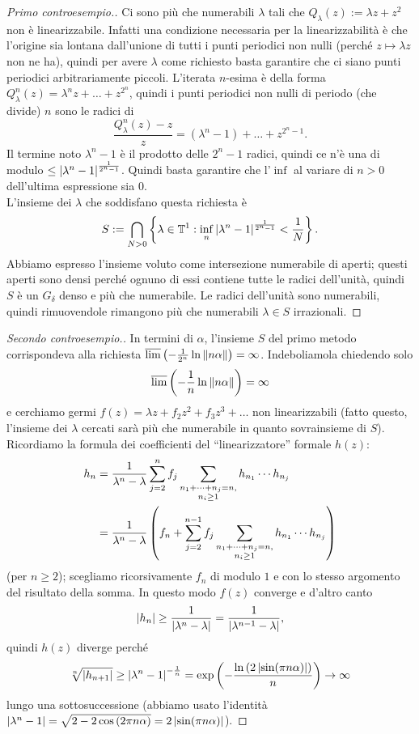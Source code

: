 \begin{proof}[Primo controesempio.]
Ci sono più che numerabili $\lambda$ tali che $Q_\lambda(z):=\lambda z+z^2$ non è linearizzabile.
Infatti una condizione necessaria per la linearizzabilità è che l'origine sia lontana dall'unione di tutti
i punti periodici non nulli (perché $z\mapsto \lambda z$ non ne ha), quindi per avere $\lambda$ come richiesto basta garantire che ci siano punti periodici arbitrariamente piccoli. L'iterata $n$-esima è della forma $Q_\lambda^n(z)=\lambda^n z+\dots+z^{2^n}$, quindi i punti periodici non nulli di periodo (che divide) $n$ sono le radici di
\[ \frac{Q_\lambda^n(z)-z}{z}=(\lambda^n-1)+\dots+z^{2^n-1}. \]
Il termine noto $\lambda^n-1$ è il prodotto delle $2^n-1$ radici, quindi ce n'è una di modulo $\le\left|\lambda^n-1\right|^{\frac{1}{2^n-1}}$.
Quindi basta garantire che l'$\inf$ al variare di $n>0$ dell'ultima espressione sia $0$. \\
L'insieme dei $\lambda$ che soddisfano questa richiesta è
\[ S:=\bigcap_{N>0}\left\{\lambda\in\mathbb{T}^1:\inf_n\left|\lambda^n-1\right|^{\frac{1}{2^n-1}}<\frac{1}{N}\right\}. \]
Abbiamo espresso l'insieme voluto come intersezione numerabile di aperti; questi aperti sono densi perché ognuno di essi contiene tutte le radici dell'unità, quindi $S$ è un $G_\delta$ denso e più che numerabile. Le radici dell'unità sono numerabili, quindi rimuovendole rimangono più che numerabili $\lambda\in S$ irrazionali.
\end{proof} 

\begin{proof}[Secondo controesempio.]
In termini di $\alpha$, l'insieme $S$ del primo metodo corrispondeva alla richiesta
$\overline{\lim}\left(-\frac{1}{2^n}\ln\left\|n\alpha\right\|\right)=\infty$. Indeboliamola chiedendo solo
\[ \overline{\lim}\left(-\frac{1}{n}\ln\left\|n\alpha\right\|\right)=\infty \]
e cerchiamo germi $f(z)=\lambda z+f_2 z^2+f_3 z^3+\dots$ non linearizzabili (fatto questo, l'insieme dei $\lambda$ cercati
sarà più che numerabile in quanto sovrainsieme di $S$).
Ricordiamo la formula dei coefficienti del ``linearizzatore'' formale $h(z)$:
\[ \begin{split} h_n&=\frac{1}{\lambda^n-\lambda}\sum_{j=2}^n f_j\sum_{\substack{n_1+\dots+n_j=n,\\n_i\ge 1}}h_{n_1}\cdots h_{n_j} \\
&=\frac{1}{\lambda^n-\lambda}\left(f_n+\sum_{j=2}^{n-1}f_j\sum_{\substack{n_1+\dots+n_j=n,\\n_i\ge 1}}h_{n_1}\cdots h_{n_j}\right) \end{split} \]
(per $n\ge 2$); scegliamo ricorsivamente $f_n$ di modulo $1$ e con lo stesso argomento del risultato della somma.
In questo modo $f(z)$ converge e d'altro canto
\[ \left|h_n\right|\ge\frac{1}{\left|\lambda^n-\lambda\right|}=\frac{1}{\left|\lambda^{n-1}-\lambda\right|}, \]
quindi $h(z)$ diverge perché
\[ \sqrt[n]{\left|h_{n+1}\right|}\ge\left|\lambda^n-1\right|^{-\frac{1}{n}}=\exp\left(-\frac{\ln\left(2\left|\sin(\pi n\alpha)\right|\right)}{n}\right)\to\infty \]
lungo una sottosuccessione (abbiamo usato l'identità $\left|\lambda^n-1\right|=\sqrt{2-2\cos\left(2\pi n\alpha\right)}=2\left|\sin(\pi n\alpha)\right|$).
\end{proof}

